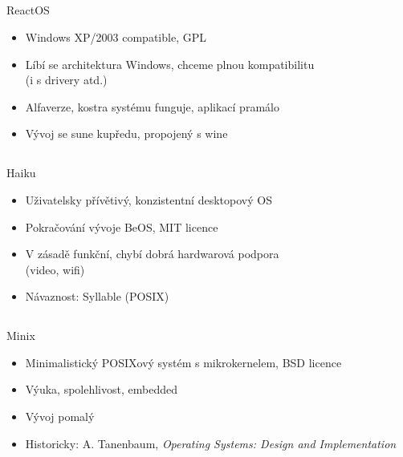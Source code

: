 \documentclass{beamer}
\begin{document}
\subsection{}
\begin{frame}{ReactOS}
\begin{itemize}
\item Windows XP/2003 compatible, GPL
\item Líbí se architektura Windows, chceme plnou kompatibilitu\\ (i s drivery atd.)
\item Alfaverze, kostra systému funguje, aplikací pramálo
\item Vývoj se sune kupředu, propojený s wine
\end{itemize}
\end{frame}

\subsection{}
\begin{frame}{Haiku}
\begin{itemize}
\item Uživatelsky přívětivý, konzistentní desktopový OS
\item Pokračování vývoje BeOS, MIT licence
\item V zásadě funkční, chybí dobrá hardwarová podpora\\ (video, wifi)
\item Návaznost: Syllable (POSIX)
\end{itemize}
\end{frame}

\subsection{}
\begin{frame}{Minix}
\begin{itemize}
\item Minimalistický POSIXový systém s mikrokernelem, BSD licence
\item Výuka, spolehlivost, embedded
\item Vývoj pomalý
\item Historicky: A. Tanenbaum, {\em Operating Systems: Design and Implementation}
\end{itemize}
\end{frame}
\end{document}
